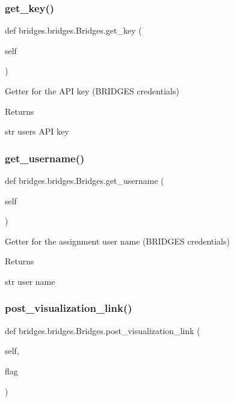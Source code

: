 \subsubsection{\texorpdfstring{get\+\_\+key()}{get\_key()}}
{\footnotesize\ttfamily def bridges.\+bridges.\+Bridges.\+get\+\_\+key (\begin{DoxyParamCaption}\item[{}]{self }\end{DoxyParamCaption})}



Getter for the A\+PI key (B\+R\+I\+D\+G\+ES credentials) 

\begin{DoxyReturn}{Returns}


str user\textquotesingle{}s A\+PI key 
\end{DoxyReturn}
\mbox{\label{classbridges_1_1bridges_1_1_bridges_abf6fdb19db336c2ed14987fdd89d65fe}} 
\subsubsection{\texorpdfstring{get\+\_\+username()}{get\_username()}}
{\footnotesize\ttfamily def bridges.\+bridges.\+Bridges.\+get\+\_\+username (\begin{DoxyParamCaption}\item[{}]{self }\end{DoxyParamCaption})}



Getter for the assignment user name (B\+R\+I\+D\+G\+ES credentials) 

\begin{DoxyReturn}{Returns}


str user name 
\end{DoxyReturn}
\mbox{\label{classbridges_1_1bridges_1_1_bridges_affea08c46fe175e8ed319b14db319fb1}} 
\subsubsection{\texorpdfstring{post\+\_\+visualization\+\_\+link()}{post\_visualization\_link()}}
{\footnotesize\ttfamily def bridges.\+bridges.\+Bridges.\+post\+\_\+visualization\+\_\+link (\begin{DoxyParamCaption}\item[{}]{self,  }\item[{}]{flag }\end{DoxyParamCaption})}



